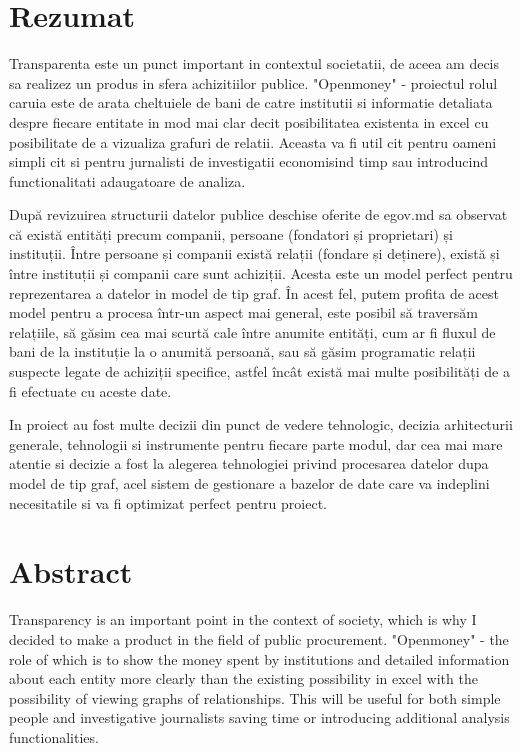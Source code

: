 \documentclass[12pt,a4paper,titlepage]{article}
\begin{document}
\renewcommand{\thelstlisting}{\thesection.\arabic{lstlisting}}






\section*{Rezumat}
Transparenta este un punct important in contextul societatii, de aceea am decis sa realizez un produs in sfera achizitiilor publice. "Openmoney" - proiectul rolul caruia este de arata cheltuiele de bani de catre institutii si informatie detaliata despre fiecare entitate in mod mai clar decit posibilitatea existenta in excel cu posibilitate de a vizualiza grafuri de relatii. Aceasta va fi util cit pentru oameni simpli cit si pentru jurnalisti de investigatii economisind timp sau introducind functionalitati adaugatoare de analiza.



După revizuirea structurii datelor publice deschise oferite de egov.md sa observat că există entități precum companii, persoane (fondatori și proprietari) și instituții. Între persoane și companii există relații (fondare și deținere), există și între instituții și companii care sunt achiziții. Acesta este un model perfect pentru reprezentarea a datelor in model de tip graf. În acest fel, putem profita de acest model pentru a procesa într-un aspect mai general, este posibil să traversăm relațiile, să găsim cea mai scurtă cale între anumite entități, cum ar fi fluxul de bani de la instituție la o anumită persoană, sau să găsim programatic relații suspecte legate de achiziții specifice, astfel încât există mai multe posibilități de a fi efectuate cu aceste date.

In proiect au fost multe decizii din punct de vedere tehnologic, decizia arhitecturii generale, tehnologii si instrumente pentru fiecare parte modul, dar cea mai mare atentie si decizie a fost la alegerea tehnologiei privind procesarea datelor dupa model de tip graf, acel sistem de gestionare a bazelor de date care va indeplini necesitatile si va fi optimizat perfect pentru proiect.


\newpage
\section*{Abstract}
Transparency is an important point in the context of society, which is why I decided to make a product in the field of public procurement. "Openmoney" - the role of which is to show the money spent by institutions and detailed information about each entity more clearly than the existing possibility in excel with the possibility of viewing graphs of relationships. This will be useful for both simple people and investigative journalists saving time or introducing additional analysis functionalities.
\end{document}
